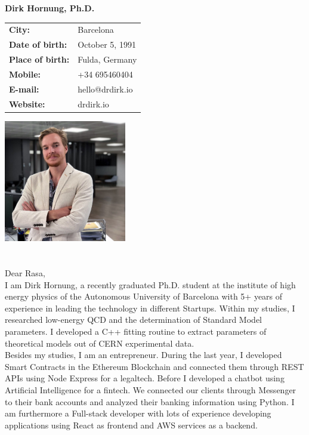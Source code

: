 \documentclass[11pt]{article}
\begin{document}
\Large
\noindent
\textbf{Dirk Hornung, Ph.D.} \\

\normalsize
\noindent
\begin{minipage}{0.5\linewidth}
  \begin{tabularx}{0.6\textwidth}{>{\bfseries}l l}
    City:           & Barcelona \\
    Date of birth:  & October 5, 1991\\
    Place of birth: & Fulda, Germany \\
    Mobile:         & +34 695460404 \\
    E-mail:         & hello@drdirk.io \\
    Website:      	& drdirk.io
  \end{tabularx}
\end{minipage}
\begin{minipage}{0.5\linewidth}
  \begin{flushright}
    \includegraphics[width=0.4\textwidth]{dirk.png}
  \end{flushright}
\end{minipage}

 \section*{}
 \vspace{1cm}
 Dear Rasa, \\

 \noindent I am Dirk Hornung, a recently graduated Ph.D. student at the institute
 of high energy physics of the Autonomous University of Barcelona with 5+ years
 of experience in leading the technology in different Startups. Within my
 studies, I researched low-energy QCD and the determination of Standard Model
 parameters. I developed a C++ fitting routine to extract parameters of
 theoretical models out of CERN experimental data. \\

 \noindent Besides my studies, I am an entrepreneur. During the last year, I
 developed Smart Contracts in the Ethereum Blockchain and connected them through
 REST APIs using Node Express for a legaltech. Before I developed a chatbot using
 Artificial Intelligence for a fintech. We connected our clients through
 Messenger to their bank accounts and analyzed their banking information using
 Python. I am furthermore a Full-stack developer with lots of experience
 developing
 applications using React as frontend and AWS services as a backend.  \\
\end{document}
